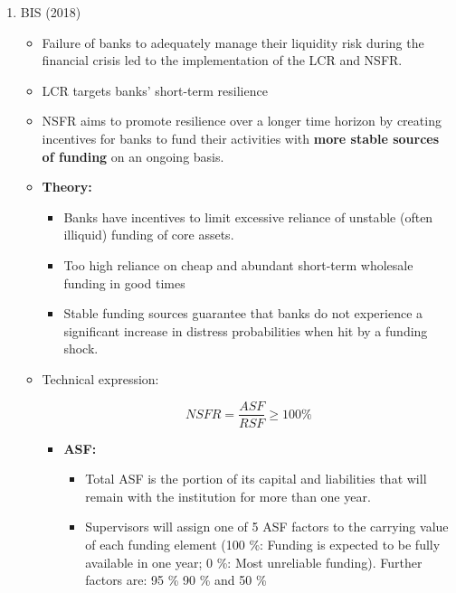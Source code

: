 \documentclass[a4paper,12pt]{article}
\begin{document}
\begin{enumerate}
	\item BIS (2018)
		\begin{itemize}
			\item Failure of banks to adequately manage their liquidity risk during the financial crisis led to the implementation of the LCR and NSFR.

			\item LCR targets banks' short-term resilience

			\item NSFR aims to promote resilience over a longer time horizon by creating incentives for banks to fund their activities with \textbf{more stable sources of funding} on an ongoing basis.

			\item \textbf{Theory:}
			\begin{itemize}
				\item Banks have incentives to limit excessive reliance of unstable (often illiquid) funding of core assets. 

				\item Too high reliance on cheap and abundant short-term wholesale funding in good times

				\item Stable funding sources guarantee that banks do not experience a significant increase in distress probabilities when hit by a funding shock.
			\end{itemize}

			\item Technical expression:

			\begin{equation}
				NSFR = \frac{ASF}{RSF} \geq 100 \%
			\end{equation}

			\begin{itemize}
				\item \textbf{ASF:}

					\begin{itemize}
						\item Total ASF is the portion of its capital and liabilities that will remain with the institution for more than one year. 

						\item Supervisors will assign one of 5 ASF factors to the carrying value of each funding element (100 \%: Funding is expected to be fully available in one year; 0 \%: Most unreliable funding). Further factors are: 95 \%  90 \% and 50 \%


\end{itemize}
\end{itemize}
\end{itemize}
\end{enumerate}
\end{document}
